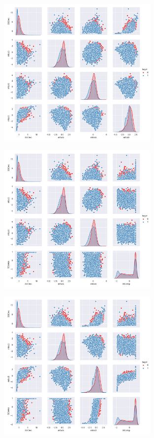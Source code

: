 \begin{figure}[h]
\centering
\includegraphics[width=0.7\textwidth]{output/figure_7.png}
\end{figure}
\begin{figure}[h]
\centering
\includegraphics[width=0.7\textwidth]{output/figure_8.png}
\end{figure}
\begin{figure}[h]
\centering
\includegraphics[width=0.7\textwidth]{output/figure_9.png}
\end{figure}
